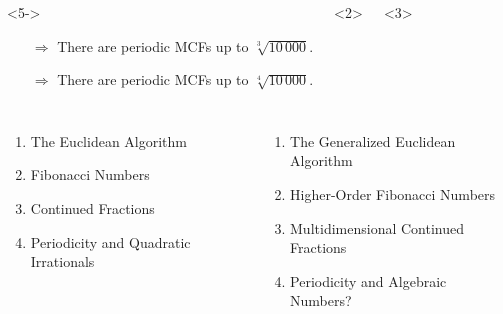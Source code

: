 \documentclass[aspectratio=169]{beamer}
\begin{document}
\begin{frame}
\begin{columns}
\begin{onlyenv}
      \begin{onlyenv}<5->
        \begin{itemize}
          \item[$\Rightarrow$] There are periodic MCFs up to $\sqrt[3]{10\,000}$.
          \item[$\Rightarrow$] There are periodic MCFs up to $\sqrt[4]{10\,000}$.
        \end{itemize}
      \end{onlyenv}
    \end{onlyenv}
    \begin{onlyenv}<2>
    \end{onlyenv}
    \begin{onlyenv}<3>
    \end{onlyenv}
  \end{columns}
\end{frame}

\begin{frame}
  \small
  \begin{columns}
    \begin{enumerate}
      \item The Euclidean Algorithm
      \item Fibonacci Numbers
      \item Continued Fractions
      \item Periodicity and Quadratic Irrationals
    \end{enumerate}

    \begin{enumerate}
      \item The Generalized Euclidean Algorithm
      \item Higher-Order Fibonacci Numbers
      \item Multidimensional Continued Fractions
      \item Periodicity and Algebraic Numbers?
    \end{enumerate}
  \end{columns}
\end{frame}

\begin{frame}

\end{frame}
\end{document}
